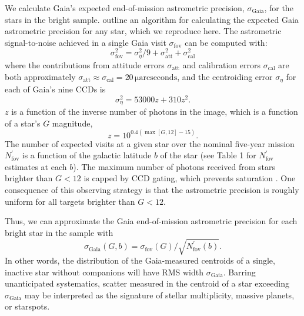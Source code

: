 We calculate Gaia's expected end-of-mission astrometric precision, $\sigma_{\mathrm{Gaia}}$, for the stars in the bright sample. \citet{Perryman2014} outline an algorithm for calculating the expected Gaia astrometric precision for any star, which we reproduce here. The astrometric signal-to-noise achieved in a single Gaia visit $\sigma_{\mathrm{fov}}$ can be computed with:
\begin{equation}
\sigma_{\mathrm{fov}}^2 = \sigma_\eta^2/9 + \sigma_{\mathrm{att}}^2 + \sigma_{\mathrm{cal}}^2
\end{equation}
where the contributions from attitude errors $\sigma_{\mathrm{att}}$ and calibration errors $\sigma_{\mathrm{cal}}$ are both approximately $\sigma_{\mathrm{att}} \approx \sigma_{\mathrm{cal}} = 20 \,\mathrm{\mu arcseconds}$, and the centroiding error $\sigma_\eta$ for each of Gaia's nine CCDs is	
\begin{equation}
\sigma_\eta^2 = 53000 z + 310 z^2.
\end{equation}
$z$ is a function of the inverse number of photons in the image, which is a function of a star's $G$ magnitude,
\begin{equation}
z = 10^{0.4\left(\max[G, 12] - 15\right)}. \label{eqn:z}
\end{equation}
The number of expected visits at a given star over the nominal five-year mission $N^\prime_{\mathrm{fov}}$ is a function of the galactic latitude $b$ of the star (see \citealt{Perryman2014} Table 1 for $N^\prime_{\mathrm{fov}}$ estimates at each $b$). The maximum number of photons received from stars brighter than $G < 12$ is capped by CCD gating, which prevents saturation \citep{Perryman2014}. One consequence of this observing strategy is that the astrometric precision is roughly uniform for all targets brighter than $G < 12$. 

Thus, we can approximate the Gaia end-of-mission astrometric precision for each bright star in the sample with 
\begin{equation}
\sigma_{\mathrm{Gaia}}(G, b) = \sigma_{\mathrm{fov}}(G) / \sqrt{N^\prime_{\mathrm{fov}}(b)}. 
\end{equation}
In other words, the distribution of the Gaia-measured centroids of a single, inactive star without companions will have RMS width $\sigma_{\mathrm{Gaia}}$. Barring unanticipated systematics, scatter measured in the centroid of a star exceeding $\sigma_{\mathrm{Gaia}}$ may be interpreted as the signature of stellar multiplicity, massive planets, or starspots.

